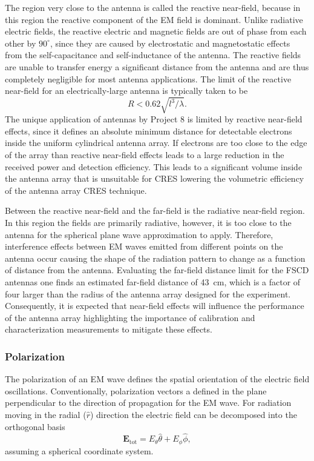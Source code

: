 The region very close to the antenna is called the reactive near-field, because in this region the reactive component of the EM field is dominant. Unlike radiative electric fields, the reactive electric and magnetic fields are out of phase from each other by $90^\circ$, since they are caused by electrostatic and magnetostatic effects from the self-capacitance and self-inductance of the antenna. The reactive fields are unable to transfer energy a significant distance from the antenna and are thus completely negligible for most antenna applications. The limit of the reactive near-field for an electrically-large antenna is typically taken to be
\begin{equation}
    R<0.62\sqrt{l^3/\lambda}.
\end{equation}
The unique application of antennas by Project 8 is limited by reactive near-field effects, since it defines an absolute minimum distance for detectable electrons inside the uniform cylindrical antenna array. If electrons are too close to the edge of the array than reactive near-field effects leads to a large reduction in the received power and detection efficiency. This leads to a significant volume inside the antenna array that is unsuitable for CRES lowering the volumetric efficiency of the antenna array CRES technique.

Between the reactive near-field and the far-field is the radiative near-field region. In this region the fields are primarily radiative, however, it is too close to the antenna for the spherical plane wave approximation to apply. Therefore, interference effects between EM waves emitted from different points on the antenna occur causing the shape of the radiation pattern to change as a function of distance from the antenna. Evaluating the far-field distance limit for the FSCD antennas one finds an estimated far-field distance of 43~cm, which is a factor of four larger than the radius of the antenna array designed for the experiment. Consequently, it is expected that near-field effects will influence the performance of the antenna array highlighting the importance of calibration and characterization measurements to mitigate these effects.

\subsubsection{Polarization}
The polarization of an EM wave defines the spatial orientation of the electric field oscillations. Conventionally, polarization vectors a defined in the plane perpendicular to the direction of propagation for the EM wave. For radiation moving in the radial ($\hat{r}$) direction the electric field can be decomposed into the orthogonal basis
\begin{equation}
    \mathbf{E}_\mathrm{tot}=E_\theta\hat{\theta}+E_\phi\hat{\phi},
\end{equation}
assuming a spherical coordinate system. 

